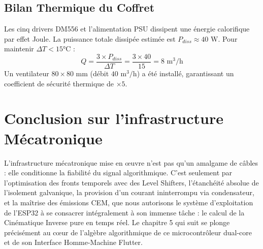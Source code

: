 \subsection{Bilan Thermique du Coffret}
Les cinq drivers DM556 et l'alimentation PSU dissipent une énergie calorifique par effet Joule. La puissance totale dissipée estimée est $P_{diss} \approx 40\text{ W}$. Pour maintenir $\Delta T < 15°\text{C}$ :
\begin{equation}
    Q = \frac{3 \times P_{diss}}{\Delta T} = \frac{3 \times 40}{15} = \boxed{8\text{ m}^3\text{/h}}
\end{equation}
Un ventilateur $80 \times 80\text{ mm}$ (débit $40\text{ m}^3\text{/h}$) a été installé, garantissant un coefficient de sécurité thermique de $\times 5$.

\section{Conclusion sur l'infrastructure Mécatronique}
L'infrastructure mécatronique mise en œuvre n'est pas qu'un amalgame de câbles : elle conditionne la fiabilité du signal algorithmique. C'est seulement par l'optimisation des fronts temporels avec des Level Shifters, l'étanchéité absolue de l'isolement galvanique, la provision d'un courant ininterrompu via condensateur, et la maîtrise des émissions CEM, que nous autorisons le système d'exploitation de l'ESP32 à se consacrer intégralement à son immense tâche : le calcul de la Cinématique Inverse pure en temps réel. Le chapitre 5 qui suit se plonge précisément au cœur de l'algèbre algorithmique de ce microcontrôleur dual-core et de son Interface Homme-Machine Flutter.